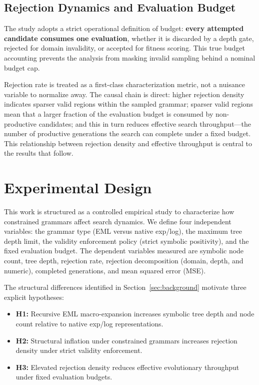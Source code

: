 \documentclass[runningheads]{llncs}
\begin{document}
\subsection{Rejection Dynamics and Evaluation Budget}\label{sub:rejection_dynamics}

The study adopts a strict operational definition of budget: \textbf{every
attempted candidate consumes one evaluation}, whether it is discarded by a
depth gate, rejected for domain invalidity, or accepted for fitness scoring.
This true budget accounting prevents the analysis from masking invalid
sampling behind a nominal budget cap.

Rejection rate is treated as a first-class characterization metric, not a
nuisance variable to normalize away. The causal chain is direct: higher
rejection density indicates sparser valid regions within the sampled grammar;
sparser valid regions mean that a larger fraction of the evaluation budget is
consumed by non-productive candidates; and this in turn reduces effective
search throughput---the number of productive generations the search can
complete under a fixed budget. This relationship between rejection density
and effective throughput is central to the results that follow.

\section{Experimental Design}\label{sec:experimental_design}

This work is structured as a controlled empirical study to characterize how constrained grammars affect search dynamics. We define four independent variables: the grammar type (EML versus native exp/log), the maximum tree depth limit, the validity enforcement policy (strict symbolic positivity), and the fixed evaluation budget. The dependent variables measured are symbolic node count, tree depth, rejection rate, rejection decomposition (domain, depth, and numeric), completed generations, and mean squared error (MSE).

The structural differences identified in Section~\ref{sec:background} motivate three explicit hypotheses:
\begin{itemize}[itemsep=0pt,topsep=0pt]
  \item \textbf{H1:} Recursive EML macro-expansion increases symbolic tree depth and node count relative to native exp/log representations.
  \item \textbf{H2:} Structural inflation under constrained grammars increases rejection density under strict validity enforcement.
  \item \textbf{H3:} Elevated rejection density reduces effective evolutionary throughput under fixed evaluation budgets.
\end{itemize}
\end{document}
